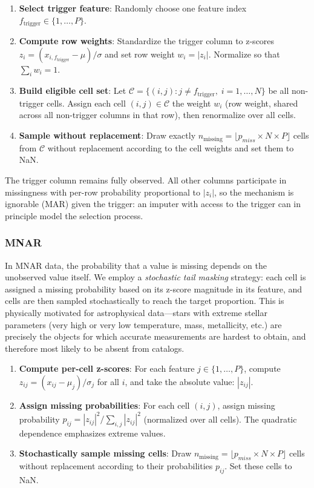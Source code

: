 \documentclass[preprint,longauthor,twocolumn]{aastex631}
\begin{document}
\begin{enumerate}
  \item \textbf{Select trigger feature}: Randomly choose one feature index $f_{\text{trigger}} \in \{1, \ldots, P\}$.
  \item \textbf{Compute row weights}: Standardize the trigger column to z-scores $z_i = (x_{i,f_{\text{trigger}}} - \mu) / \sigma$ and set row weight $w_i = |z_i|$. Normalize so that $\sum_i w_i = 1$.
  \item \textbf{Build eligible cell set}: Let $\mathcal{C} = \{(i, j) : j \neq f_{\text{trigger}},\; i = 1, \ldots, N\}$ be all non-trigger cells. Assign each cell $(i, j) \in \mathcal{C}$ the weight $w_i$ (row weight, shared across all non-trigger columns in that row), then renormalize over all cells.
  \item \textbf{Sample without replacement}: Draw exactly $n_{\text{missing}} = \lfloor p_{miss}  \times N \times P \rfloor$ cells from $\mathcal{C}$ without replacement according to the cell weights and set them to NaN.
\end{enumerate}

The trigger column remains fully observed. All other columns participate in missingness with per-row probability proportional to $|z_i|$, so the mechanism is ignorable (MAR) given the trigger: an imputer with access to the trigger can in principle model the selection process.

\subsubsection{MNAR}

In MNAR data, the probability that a value is missing depends on the unobserved value itself. We employ a \emph{stochastic tail masking} strategy: each cell is assigned a missing probability based on its z-score magnitude in its feature, and cells are then sampled stochastically to reach the target proportion. This is physically motivated for astrophysical data---stars with extreme stellar parameters (very high or very low temperature, mass, metallicity, etc.) are precisely the objects for which accurate measurements are hardest to obtain, and therefore most likely to be absent from catalogs.

\begin{enumerate}
  \item \textbf{Compute per-cell z-scores}: For each feature $j \in \{1, \ldots, P\}$, compute $z_{ij} = (x_{ij} - \mu_j) / \sigma_j$ for all $i$, and take the absolute value: $|z_{ij}|$.
  \item \textbf{Assign missing probabilities}: For each cell $(i,j)$, assign missing probability $p_{ij} = |z_{ij}|^2 / \sum_{i,j} |z_{ij}|^2$ (normalized over all cells). The quadratic dependence emphasizes extreme values.
  \item \textbf{Stochastically sample missing cells}: Draw $n_{\text{missing}} = \lfloor p_{miss}  \times N \times P \rfloor$ cells without replacement according to their probabilities $p_{ij}$. Set these cells to NaN.
\end{enumerate}
\end{document}
